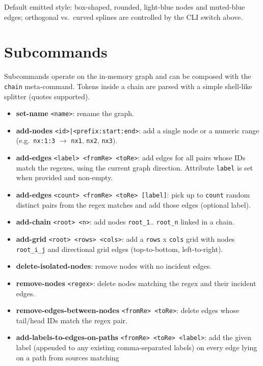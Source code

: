\documentclass[11pt]{article}
\begin{document}
Default emitted style: box-shaped, rounded, light-blue nodes and
muted-blue edges; orthogonal vs.\ curved splines are controlled by the
CLI switch above.

\section{Subcommands}

Subcommands operate on the in-memory graph and can be composed with
the \texttt{chain} meta-command.  Tokens inside a chain are parsed with
a simple shell-like splitter (quotes supported).
\begin{itemize}[leftmargin=*]
  \item \textbf{set-name} \texttt{<name>}: rename the graph.
  \item \textbf{add-nodes} \texttt{<id>|<prefix:start:end>}: add a
        single node or a numeric range (e.g.\ \texttt{nx:1:3}
        $\rightarrow$ \texttt{nx1}, \texttt{nx2}, \texttt{nx3}).
  \item \textbf{add-edges} \texttt{<label> <fromRe> <toRe>}: add edges
        for all pairs whose IDs match the regexes, using the current
        graph direction.  Attribute \texttt{label} is set when
        provided and non-empty.
  \item \textbf{add-edges} \texttt{<count> <fromRe> <toRe> [label]}:
        pick up to \texttt{count} random distinct pairs from the regex
        matches and add those edges (optional label).
  \item \textbf{add-chain} \texttt{<root> <n>}: add nodes
        \texttt{root\_1}.. \texttt{root\_n} linked in a chain.
  \item \textbf{add-grid} \texttt{<root> <rows> <cols>}: add a
        \texttt{rows} x \texttt{cols} grid with nodes
        \texttt{root\_i\_j} and directional grid edges (top-to-bottom,
        left-to-right).
  \item \textbf{delete-isolated-nodes}: remove nodes with no incident
        edges.
  \item \textbf{remove-nodes} \texttt{<regex>}: delete nodes matching
        the regex and their incident edges.
  \item \textbf{remove-edges-between-nodes} \texttt{<fromRe> <toRe>}:
        delete edges whose tail/head IDs match the regex pair.
  \item \textbf{add-labels-to-edges-on-paths} \texttt{<fromRe> <toRe> <label>}:
        add the given label (appended to any existing comma-separated
        labels) on every edge lying on a path from sources matching

\end{itemize}
\end{document}

